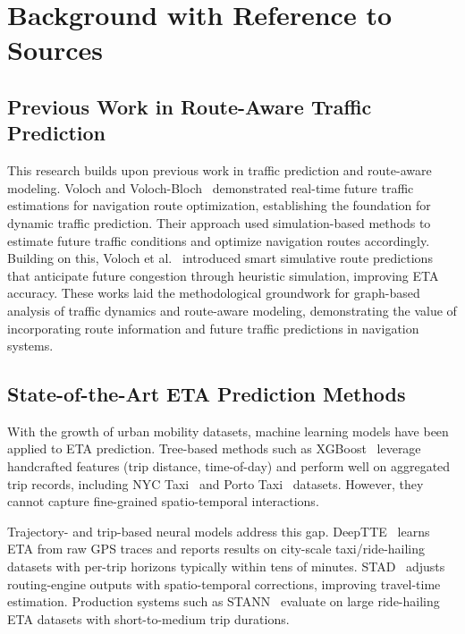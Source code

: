 \section{Background with Reference to Sources}

\subsection{Previous Work in Route-Aware Traffic Prediction}

This research builds upon previous work in traffic prediction and route-aware modeling. Voloch and Voloch-Bloch~\cite{voloch2021} demonstrated real-time future traffic estimations for navigation route optimization, establishing the foundation for dynamic traffic prediction. Their approach used simulation-based methods to estimate future traffic conditions and optimize navigation routes accordingly. Building on this, Voloch et al.~\cite{SmartSimulativeRoute2025} introduced smart simulative route predictions that anticipate future congestion through heuristic simulation, improving ETA accuracy. These works laid the methodological groundwork for graph-based analysis of traffic dynamics and route-aware modeling, demonstrating the value of incorporating route information and future traffic predictions in navigation systems.

\subsection{State-of-the-Art ETA Prediction Methods}

With the growth of urban mobility datasets, machine learning models have been applied to ETA prediction. Tree-based methods such as XGBoost~\cite{chen2016xgboost} leverage handcrafted features (trip distance, time-of-day) and perform well on aggregated trip records, including NYC Taxi~\cite{nyc_tlc} and Porto Taxi~\cite{moreira2013porto} datasets. However, they cannot capture fine-grained spatio-temporal interactions.

Trajectory- and trip-based neural models address this gap. DeepTTE~\cite{deepTTE2018} learns ETA from raw GPS traces and reports results on city-scale taxi/ride-hailing datasets with per-trip horizons typically within tens of minutes. STAD~\cite{abbar2020stad} adjusts routing-engine outputs with spatio-temporal corrections, improving travel-time estimation. Production systems such as STANN~\cite{stann2021} evaluate on large ride-hailing ETA datasets with short-to-medium trip durations.


